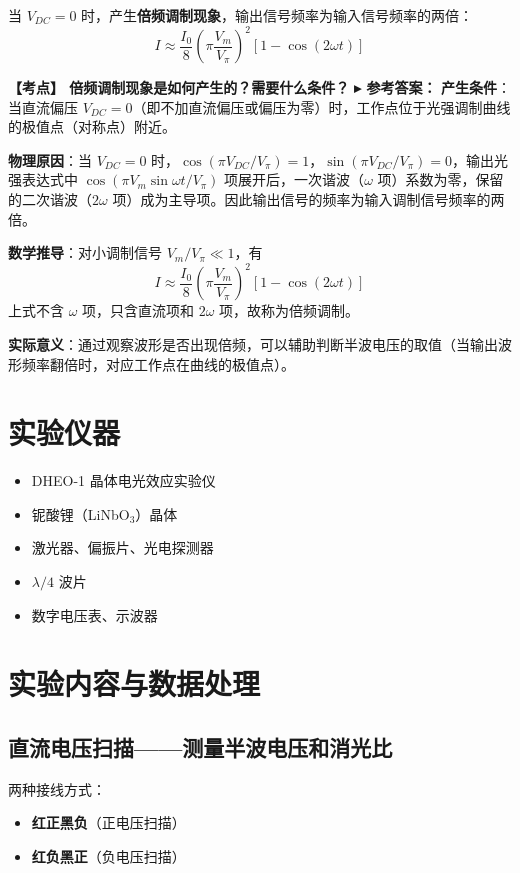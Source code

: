 \documentclass[12pt,a4paper]{article}
\newcommand{\exam}[1]{\textbf{\color{blue!70!black}【考点】#1}}
\newcommand{\answer}[1]{\vspace{2pt}\noindent\textbf{\color{teal!80!black}▸ 参考答案：}#1\vspace{4pt}}
\newcommand{\qa}[2]{\exam{#1}\answer{#2}}
\begin{document}
当 \(V_{DC}=0\) 时，产生\textbf{倍频调制现象}，输出信号频率为输入信号频率的两倍：
\begin{equation}
    I \approx \frac{I_0}{8} \left(\pi \frac{V_m}{V_\pi}\right)^2 \left[1 - \cos(2\omega t)\right]
\end{equation}

\qa{
    倍频调制现象是如何产生的？需要什么条件？
}{
    \textbf{产生条件}：当直流偏压 $V_{DC}=0$（即不加直流偏压或偏压为零）时，工作点位于光强调制曲线的极值点（对称点）附近。

    \textbf{物理原因}：当 $V_{DC}=0$ 时，$\cos(\pi V_{DC}/V_\pi)=1$，$\sin(\pi V_{DC}/V_\pi)=0$，输出光强表达式中 $\cos(\pi V_m \sin\omega t / V_\pi)$ 项展开后，一次谐波（$\omega$ 项）系数为零，保留的二次谐波（$2\omega$ 项）成为主导项。因此输出信号的频率为输入调制信号频率的两倍。

    \textbf{数学推导}：对小调制信号 $V_m/V_\pi \ll 1$，有
    \[
    I \approx \frac{I_0}{8}\left(\pi\frac{V_m}{V_\pi}\right)^2[1-\cos(2\omega t)]
    \]
    上式不含 $\omega$ 项，只含直流项和 $2\omega$ 项，故称为倍频调制。

    \textbf{实际意义}：通过观察波形是否出现倍频，可以辅助判断半波电压的取值（当输出波形频率翻倍时，对应工作点在曲线的极值点）。
}

\section{实验仪器}
\begin{itemize}
    \item DHEO-1 晶体电光效应实验仪
    \item 铌酸锂（LiNbO\(_3\)）晶体
    \item 激光器、偏振片、光电探测器
    \item \(\lambda/4\) 波片
    \item 数字电压表、示波器
\end{itemize}

\section{实验内容与数据处理}

\subsection{直流电压扫描——测量半波电压和消光比}
两种接线方式：
\begin{itemize}
    \item \textbf{红正黑负}（正电压扫描）
    \item \textbf{红负黑正}（负电压扫描）
\end{itemize}
\end{document}
